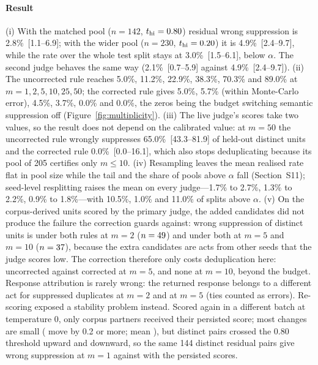 \paragraph{Result} (i) With the matched pool ($n=142$, $t_{\mathrm{hi}}=0.80$) residual wrong suppression is 2.8\%~[1.1--6.9]; with the wider pool ($n=230$, $t_{\mathrm{hi}}=0.20$) it is 4.9\%~[2.4--9.7], while the rate over the whole test split stays at 3.0\%~[1.5--6.1], below $\alpha$. The second judge behaves the same way (2.1\%~[0.7--5.9] against 4.9\%~[2.4--9.7]). (ii) The uncorrected rule reaches 5.0\%, 11.2\%, 22.9\%, 38.3\%, 70.3\% and 89.0\% at $m=1,2,5,10,25,50$; the corrected rule gives 5.0\%, 5.7\% (within Monte-Carlo error), 4.5\%, 3.7\%, 0.0\% and 0.0\%, the zeros being the budget switching semantic suppression off (Figure~\ref{fig:multiplicity}). (iii) The live judge's scores take two values, so the result does not depend on the calibrated value: at $m=50$ the uncorrected rule wrongly suppresses 65.0\%~[43.3--81.9] of held-out distinct units and the corrected rule 0.0\%~[0.0--16.1], which also stops deduplicating because its pool of 205 certifies only $m\le10$. (iv) Resampling leaves the mean realised rate flat in pool size while the tail and the share of pools above $\alpha$ fall (Section~S11); seed-level resplitting raises the mean on every judge---1.7\% to 2.7\%, 1.3\% to 2.2\%, 0.9\% to 1.8\%---with 10.5\%, 1.0\% and 11.0\% of splits above $\alpha$. (v) On the corpus-derived units scored by the primary judge, the added candidates did not produce the failure the correction guards against: wrong suppression of distinct units is \mclWSUncTwo{} under both rules at $m=2$ ($n=49$) and \mclWSUncFive{} under both at $m=5$ and $m=10$ ($n=37$), because the extra candidates are acts from other seeds that the judge scores low. The correction therefore only costs deduplication here: \mclDedupUncFive{} uncorrected against \mclDedupBonFive{} corrected at $m=5$, and none at $m=10$, beyond the budget. Response attribution is rarely wrong: the returned response belongs to a different act for \mclAttrCountUncTwo{} suppressed duplicates at $m=2$ and \mclAttrCountUncFive{} at $m=5$ (ties counted as errors). Re-scoring exposed a stability problem instead. Scored again in a different batch at temperature 0, only \mclDriftIdenticalCount{} corpus partners received their persisted score; most changes are small (\mclDriftLarge{} move by 0.2 or more; mean \mclDriftSigned), but \mclCrossedUp{} distinct pairs crossed the 0.80 threshold upward and \mclCrossedDown{} downward, so the same 144 distinct residual pairs give \mclMOneFresh{} wrong suppression at $m=1$ against \mclMOnePersisted{} with the persisted scores.


